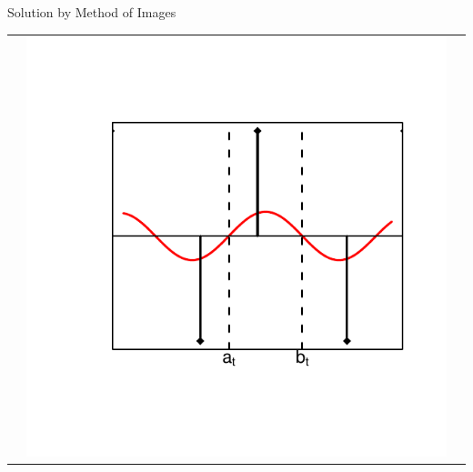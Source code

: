 \documentclass{beamer}
\begin{document}
\begin{frame}{Solution by Method of Images}
\begin{centering}
\begin{tabular}{ccc}
\begin{minipage}{0.3\textwidth}
	\[ \]
\end{minipage}

&

\begin{minipage}{0.3\textwidth}
	\includegraphics[scale=0.4,angle=0]{./section-2-figures/g3.pdf}
\end{minipage}
\vspace{-20mm}

& 

\begin{minipage}{0.3\textwidth}
	\[ \]
\end{minipage}


\end{tabular}
\end{centering}


\end{frame}


%
%
%
%
%
%
%
%
\end{document}
